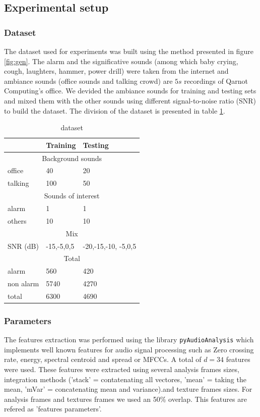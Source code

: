 \documentclass[10pt, conference, compsocconf]{IEEEtran}
\begin{document}
\subsection{Experimental setup}
\subsubsection{Dataset}
The dataset used for experiments was built using the method presented in figure \ref{fig:gen}. The alarm and the significative sounds (among which baby crying, cough, laughters, hammer, power drill) were taken from the internet and ambiance sounds (office sounds and talking crowd) are $5s$ recordings of Qarnot Computing's office. We devided the ambiance sounds for training and testing sets and mixed them with the other sounds using different signal-to-noise ratio (SNR) to build the dataset. The division of the dataset is presented in table \ref{table:dataset}.

\begin{table}[h]
  \centering
  \begin{tabular}{|*{3}{l|}}
    \hline
    & Training & Testing \\
    \hline
    \multicolumn{3}{|c|}{Background sounds} \\
    \hline
    office & 40 & 20\\
    talking & 100 & 50 \\
    \hline
    \multicolumn{3}{|c|}{Sounds of interest} \\
    \hline
    alarm & 1 & 1 \\
    others & 10 & 10 \\
    \hline
    \multicolumn{3}{|c|}{Mix} \\
    \hline
    SNR (dB)& -15,-5,0,5 & -20,-15,-10, -5,0,5 \\
    \hline
    \multicolumn{3}{|c|}{Total} \\ 
    \hline
    alarm & 560 & 420 \\
    non alarm & 5740 & 4270 \\
    total & 6300 & 4690 \\
   \hline
  \end{tabular}
\caption{dataset \label{table:dataset}}
\end{table}

\subsubsection{Parameters}
The features extraction was performed using the library \texttt{pyAudioAnalysis} \cite{pyAudioAnalysis} which implements well known features for audio signal processing such as Zero crossing rate, energy, spectral centroid and spread or MFCCs. A total of $d=34$ features were used. These features were extracted using several analysis frames sizes, integration methods ('stack' = contatenating all vectores, 'mean' = taking the mean, 'mVar' = concatenating mean and variance).and texture frames sizes. For analysis frames and textures frames we used an 50\% overlap. This features are refered as 'features parameters'. 
\end{document}
